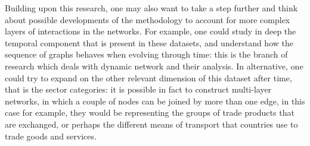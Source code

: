Building upon this research, one may also want to take a step further and think about possible developments of the methodology to account for more complex layers of interactions in the networks. For example, one could study in deep the temporal component that is present in these datasets, and understand how the sequence of graphs behaves when evolving through time: this is the branch of research which deals with dynamic network and their analysis. In alternative, one could try to expand on the other relevant dimension of this dataset after time, that is the sector categories: it is possible in fact to construct multi-layer networks, in which a couple of nodes can be joined by more than one edge, in this case for example, they would be representing the groups of trade products that are exchanged, or perhaps the different means of transport that countries use to trade goods and services.


